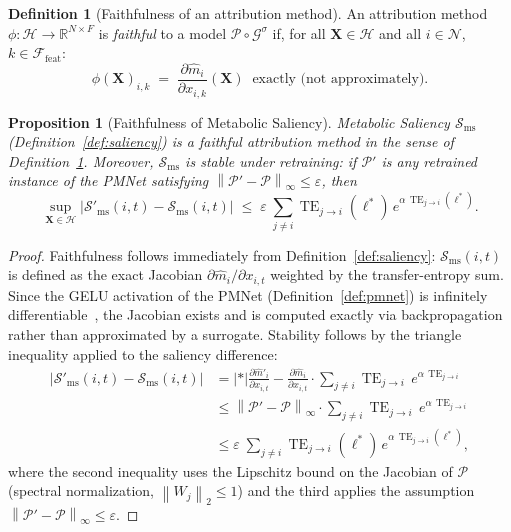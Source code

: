 \documentclass[11pt,a4paper]{article}  %
\DeclareMathOperator{\TE}{TE}
\newcommand{\R}{\mathbb{R}}
\newcommand{\norm}[1]{\left\lVert#1\right\rVert}
\newcommand{\abs}[1]{\left\lvert#1\right\rvert}
\theoremstyle{plain}
\newtheorem{proposition}[theorem]{Proposition}
\theoremstyle{definition}
\newtheorem{definition}{Definition}[section]
\theoremstyle{remark}
\begin{document}
\begin{definition}[Faithfulness of an attribution method]
\label{def:faithful}
An attribution method $\phi:\mathcal{H}\to\R^{N\times F}$ is
\emph{faithful} to a model $\mathcal{P}\circ\mathcal{G}^{\sigma}$
if, for all $\mathbf{X}\in\mathcal{H}$ and all $i\in\mathcal{N}$,
$k\in\mathcal{F}_{\mathrm{feat}}$:
\[
   \phi(\mathbf{X})_{i,k}
   \;=\;
   \frac{\partial\hat{m}_i}{\partial x_{i,k}}(\mathbf{X})
   \;\;\text{exactly (not approximately)}.
\]
\end{definition}

\begin{proposition}[Faithfulness of Metabolic Saliency]
\label{prop:faithful}
Metabolic Saliency $\mathcal{S}_{\mathrm{ms}}$ (Definition~\ref{def:saliency})
is a faithful attribution method in the sense of
Definition~\ref{def:faithful}. Moreover, $\mathcal{S}_{\mathrm{ms}}$
is \emph{stable under retraining}: if $\mathcal{P}'$ is any
retrained instance of the PMNet satisfying
$\norm{\mathcal{P}' - \mathcal{P}}_\infty \leq \varepsilon$, then
\[
   \sup_{\mathbf{X}\in\mathcal{H}}
   \abs{\mathcal{S}'_{\mathrm{ms}}(i,t) - \mathcal{S}_{\mathrm{ms}}(i,t)}
   \;\leq\; \varepsilon\;
   \sum_{j\neq i}\TE_{j\to i}(\ell^*)\,e^{\alpha\,\TE_{j\to i}(\ell^*)}.
\]
\end{proposition}

\begin{proof}
Faithfulness follows immediately from Definition~\ref{def:saliency}:
$\mathcal{S}_{\mathrm{ms}}(i,t)$ is defined as the exact Jacobian
$\partial\hat{m}_i/\partial x_{i,t}$ weighted by the
transfer-entropy sum. Since the GELU activation of the PMNet
(Definition~\ref{def:pmnet}) is infinitely differentiable~\cite{Hendrycks2016},
the Jacobian exists and is computed exactly via backpropagation
rather than approximated by a surrogate. Stability follows by the
triangle inequality applied to the saliency difference:
\begin{align*}
   \abs{\mathcal{S}'_{\mathrm{ms}}(i,t) - \mathcal{S}_{\mathrm{ms}}(i,t)}
   &= \abs*{\frac{\partial\hat{m}'_i}{\partial x_{i,t}}
            - \frac{\partial\hat{m}_i}{\partial x_{i,t}}}
      \cdot \sum_{j\neq i}\TE_{j\to i}\,e^{\alpha\,\TE_{j\to i}}\\
   &\leq \norm{\mathcal{P}' - \mathcal{P}}_\infty
      \cdot \sum_{j\neq i}\TE_{j\to i}\,e^{\alpha\,\TE_{j\to i}}\\
   &\leq \varepsilon\;
      \sum_{j\neq i}\TE_{j\to i}(\ell^*)\,e^{\alpha\,\TE_{j\to i}(\ell^*)},
\end{align*}
where the second inequality uses the Lipschitz bound on the Jacobian
of $\mathcal{P}$ (spectral normalization, $\norm{W_j}_2\leq 1$)
and the third applies the assumption
$\norm{\mathcal{P}' - \mathcal{P}}_\infty \leq \varepsilon$.
\end{proof}
\end{document}
